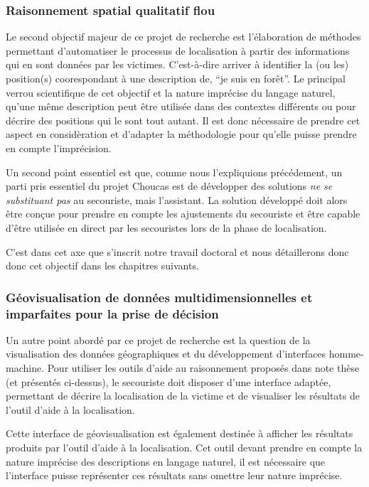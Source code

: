 \subsubsection{Raisonnement spatial qualitatif flou}

Le second objectif majeur de ce projet de recherche est l’élaboration
de méthodes permettant d'automatiser le processus de localisation à
partir des informations qui en sont données par les
victimes. C'est-à-dire arriver à identifier la (ou les) position(s)
coorespondant à une description de, \eg \enquote{je suis en forêt}. Le
principal verrou scientifique de cet objectif et la nature imprécise
du langage naturel, \ie qu'une même description peut être utilisée
dans des contextes différents ou pour décrire des positions qui le
sont tout autant. Il est donc nécessaire de prendre cet aspect en
considèration et d'adapter la méthodologie pour qu'elle puisse prendre
en compte l'imprécision.

Un second point essentiel est que, comme nous l'expliquions
précédement, un parti pris essentiel du projet Choucas est de
développer des solutions \emph{ne se substituant pas} au secouriste,
mais l’assistant. La solution développé doit alors être conçue pour
prendre en compte les ajustements du secouriste et être capable d'être
utilisée en direct par les secouristes lors de la phase de
localisation.

C'est dans cet axe que s'inscrit notre travail doctoral et nous
détaillerons donc donc cet objectif dans les chapitres suivants.

\subsubsection{Géovisualisation de données multidimensionnelles et
  imparfaites pour la prise de décision}

Un autre point abordé par ce projet de recherche est la question de la
visualisation des données géographiques et du développement
d'interfaces homme-machine. Pour utiliser les outils d'aide au
raisonnement proposés dans note thèse (et présentés ci-dessus), le
secouriste doit disposer d'une interface adaptée, permettant de
décrire la localisation de la victime et de visualiser les résultats
de l'outil d'aide à la localisation. 

Cette interface de géovisualisation est également destinée à afficher
les résultats produits par l'outil d'aide à la localisation. Cet outil
devant prendre en compte la nature imprécise des descriptions en
langage naturel, il est nécessaire que l'interface puisse représenter
ces résultats sans omettre leur nature imprécise.  

